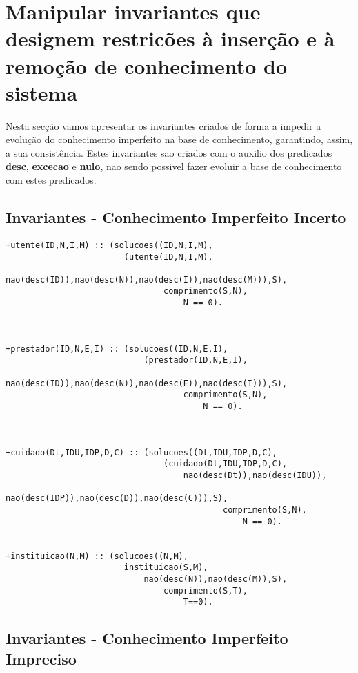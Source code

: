 \documentclass{report}
\begin{document}
\section{Manipular invariantes que designem restricões à inserção e à remoção de conhecimento do sistema}

Nesta secção vamos apresentar os invariantes criados de forma a impedir a evolução do conhecimento imperfeito na base de conhecimento, garantindo, assim, a sua consistência. Estes invariantes sao criados com o auxilio dos predicados \textbf{desc}, \textbf{excecao} e \textbf{nulo}, nao sendo possivel fazer evoluir a base de conhecimento com estes predicados.

\subsection{Invariantes - Conhecimento Imperfeito Incerto}

\begin{verbatim}
+utente(ID,N,I,M) :: (solucoes((ID,N,I,M),
                        (utente(ID,N,I,M),
                            nao(desc(ID)),nao(desc(N)),nao(desc(I)),nao(desc(M))),S),
                                comprimento(S,N),
                                    N == 0).



+prestador(ID,N,E,I) :: (solucoes((ID,N,E,I),
                            (prestador(ID,N,E,I),
                                nao(desc(ID)),nao(desc(N)),nao(desc(E)),nao(desc(I))),S),
                                    comprimento(S,N),
                                        N == 0).



+cuidado(Dt,IDU,IDP,D,C) :: (solucoes((Dt,IDU,IDP,D,C),
                                (cuidado(Dt,IDU,IDP,D,C),
                                    nao(desc(Dt)),nao(desc(IDU)),
                                        nao(desc(IDP)),nao(desc(D)),nao(desc(C))),S),
                                            comprimento(S,N),
                                                N == 0).


+instituicao(N,M) :: (solucoes((N,M),
                        instituicao(S,M),
                            nao(desc(N)),nao(desc(M)),S),
                                comprimento(S,T),
                                    T==0).
\end{verbatim}


\subsection{Invariantes - Conhecimento Imperfeito Impreciso}
\end{document}

